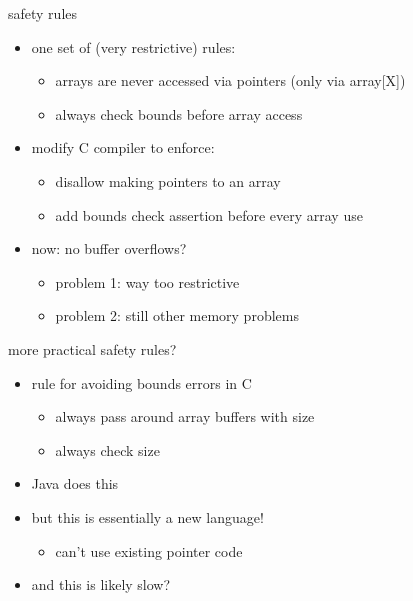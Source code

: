 \begin{frame}{safety rules}
    \begin{itemize}
    \item one set of (very restrictive) rules:
        \begin{itemize}
        \item arrays are never accessed via pointers (only via array[X])
        \item always check bounds before array access
        \end{itemize}
    \vspace{.5cm}
    \item modify C compiler to enforce:
        \begin{itemize}
        \item disallow making pointers to an array
        \item add bounds check assertion before every array use
        \end{itemize}
    \vspace{.5cm}
    \item<2-> now: no buffer overflows?
        \begin{itemize}
        \item problem 1: way too restrictive
        \item problem 2: still other memory problems
        \end{itemize}
    \end{itemize}
\end{frame}

\begin{frame}{more practical safety rules?}
    \begin{itemize}
    \item rule for avoiding bounds errors in C
        \begin{itemize}
        \item always pass around array buffers with size
        \item always check size
        \end{itemize}
    \item Java does this
    \item but this is essentially a new language!
        \begin{itemize}
        \item can't use existing pointer code
        \end{itemize}
    \item and this is likely slow?
    \end{itemize}
\end{frame}

